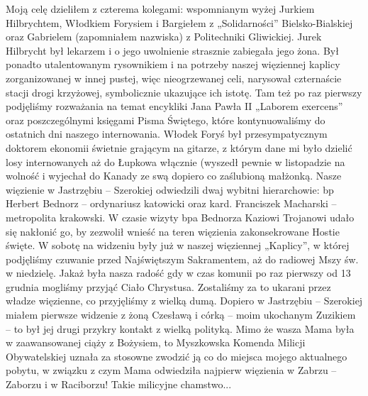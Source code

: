Moją celę dzieliłem z czterema kolegami: wspomnianym wyżej Jurkiem Hilbrychtem, Włodkiem Forysiem i Bargiełem z „Solidarności” Bielsko-Bialskiej oraz Gabrielem (zapomniałem nazwiska) z Politechniki Gliwickiej. Jurek Hilbrycht był lekarzem i o jego uwolnienie strasznie zabiegała jego żona. Był ponadto utalentowanym rysownikiem i na potrzeby naszej więziennej kaplicy zorganizowanej w innej pustej, więc nieogrzewanej celi, narysował czternaście stacji drogi krzyżowej, symbolicznie ukazujące ich istotę. Tam też po raz pierwszy podjęliśmy rozważania na temat encykliki Jana Pawła II „Laborem exercens” oraz poszczególnymi księgami Pisma Świętego, które kontynuowaliśmy do ostatnich dni naszego internowania. Włodek Foryś był przesympatycznym doktorem ekonomii świetnie grającym na gitarze, z którym dane mi było dzielić losy  internowanych aż do Łupkowa włącznie (wyszedł pewnie w listopadzie na wolność i wyjechał do Kanady ze swą dopiero co zaślubioną małżonką. Nasze więzienie w Jastrzębiu – Szerokiej odwiedzili dwaj wybitni hierarchowie: bp Herbert Bednorz – ordynariusz katowicki oraz kard. Franciszek Macharski – metropolita krakowski. W czasie wizyty bpa Bednorza Kaziowi Trojanowi udało się nakłonić go, by zezwolił wnieść na teren więzienia zakonsekrowane Hostie święte. W sobotę na widzeniu były już w naszej więziennej „Kaplicy”, w której podjęliśmy czuwanie przed Najświętszym Sakramentem, aż do radiowej Mszy św. w  niedzielę. Jakaż była nasza radość gdy w czas komunii po raz pierwszy od 13 grudnia mogliśmy przyjąć Ciało Chrystusa. Zostaliśmy za to ukarani przez władze więzienne, co przyjęliśmy z wielką dumą. Dopiero w Jastrzębiu – Szerokiej miałem pierwsze widzenie z żoną Czesławą i córką – moim ukochanym Zuzikiem – to był jej drugi przykry kontakt z wielką polityką. Mimo że wasza Mama była w zaawansowanej ciąży z Bożysiem, to Myszkowska Komenda Milicji Obywatelskiej uznała za stosowne zwodzić ją co do miejsca mojego aktualnego pobytu, w związku z czym Mama odwiedziła najpierw więzienia w Zabrzu – Zaborzu i w Raciborzu! Takie milicyjne chamstwo...

